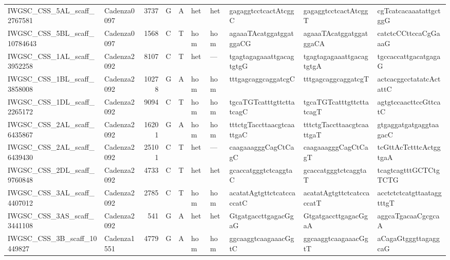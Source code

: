 \begin{longtable}{llrlllllll}
 IWGSC\_CSS\_5AL\_scaff\_2767581  & Cadenza0097 &       3737 & G         & A        & het            & het         & gagaggtcctcactAtcggC      & gagaggtcctcactAtcggT      & cgTcatcacaaatattgctggG    \\
 IWGSC\_CSS\_5BL\_scaff\_10784643 & Cadenza0097 &       1568 & C         & T        & hom            & hom         & agaaaTAcatggatggatggaCG   & agaaaTAcatggatggatggaCA   & catctcCCttccaCgGaaaG      \\
 IWGSC\_CSS\_1AL\_scaff\_3952258  & Cadenza2092 &       8107 & C         & T        & het            & ---         & tgagtagagaaattgacagtgtgG  & tgagtagagaaattgacagtgtgA  & tgccaccattgacatgagaG      \\
 IWGSC\_CSS\_1BL\_scaff\_3858008  & Cadenza2092 &      10278 & G         & A        & hom            & hom         & tttgagcaggcaggatcgC       & tttgagcaggcaggatcgT       & actcacggcctatatcActattC   \\
 IWGSC\_CSS\_1DL\_scaff\_2265172  & Cadenza2092 &       9094 & C         & T        & hom            & hom         & tgcaTGTcatttgttcttatcagC  & tgcaTGTcatttgttcttatcagT  & agtgtccaacttccGttcatC     \\
 IWGSC\_CSS\_2AL\_scaff\_6435867  & Cadenza2092 &      16201 & G         & A        & hom            & hom         & tttctgTaccttaacgtcaattgaC & tttctgTaccttaacgtcaattgaT & gtgaggatgatgaggtaagacC    \\
 IWGSC\_CSS\_2AL\_scaff\_6439430  & Cadenza2092 &      25101 & C         & T        & het            & ---         & caagaaagggCagCtCagC       & caagaaagggCagCtCagT       & tcGttAcTctttcActggtgaA    \\
 IWGSC\_CSS\_2DL\_scaff\_9760848  & Cadenza2092 &       4733 & C         & T        & het            & het         & gcaccatgggtctcaggtaC      & gcaccatgggtctcaggtaT      & tcagtcagtttGCTCtgTCTG     \\
 IWGSC\_CSS\_3AL\_scaff\_4407012  & Cadenza2092 &       2785 & C         & T        & hom            & hom         & acatatAgtgttctcatccaccatC & acatatAgtgttctcatccaccatT & acctctctcatgttaataggtttgT \\
 IWGSC\_CSS\_3AS\_scaff\_3441108  & Cadenza2092 &        541 & G         & A        & het            & het         & GtgatgaccttgagacGgaG      & GtgatgaccttgagacGgaA      & aggcaTgacaaCgcgcaA        \\
 IWGSC\_CSS\_3B\_scaff\_10449827  & Cadenza1551 &       4779 & G         & A        & hom            & hom         & ggcaaggtcaagaaacGgtC      & ggcaaggtcaagaaacGgtT      & aCagaGtgggttagaggcaG      \\

\end{longtable}

